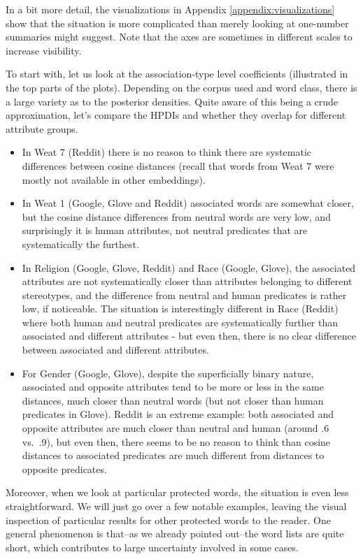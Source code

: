 \documentclass[
  12pt,
  dvipsnames,enabledeprecatedfontcommands]{scrartcl}
\begin{document}
In a bit more detail, the visualizations in Appendix
\ref{appendix:visualizations} show that the situation is more
complicated than merely looking at one-number summaries might suggest.
Note that the axes are sometimes in different scales to increase
visibility.

To start with, let us look at the association-type level coefficients
(illustrated in the top parts of the plots). Depending on the corpus
used and word class, there is a large variety as to the posterior
densities. Quite aware of this being a crude approximation, let's
compare the HPDIs and whether they overlap for different attribute
groups.

\begin{itemize}
\item
  In Weat 7 (Reddit) there is no reason to think there are systematic
  differences between cosine distances (recall that words from Weat 7
  were mostly not available in other embeddings).
\item
  In Weat 1 (Google, Glove and Reddit) associated words are somewhat
  closer, but the cosine distance differences from neutral words are
  very low, and surprisingly it is human attributes, not neutral
  predicates that are systematically the furthest.
\item
  In Religion (Google, Glove, Reddit) and Race (Google, Glove), the
  associated attributes are not systematically closer than attributes
  belonging to different stereotypes, and the difference from neutral
  and human predicates is rather low, if noticeable. The situation is
  interestingly different in Race (Reddit) where both human and neutral
  predicates are systematically further than associated and different
  attributes - but even then, there is no clear difference between
  associated and different attributes.
\item
  For Gender (Google, Glove), despite the superficially binary nature,
  associated and opposite attributes tend to be more or less in the same
  distances, much closer than neutral words (but not closer than human
  predicates in Glove). Reddit is an extreme example: both associated
  and opposite attributes are much closer than neutral and human (around
  .6 vs.~.9), but even then, there seems to be no reason to think than
  cosine distances to associated predicates are much different from
  distances to opposite predicates.
\end{itemize}

Moreover, when we look at particular protected words, the situation is
even less straightforward. We will just go over a few notable examples,
leaving the visual inspection of particular results for other protected
words to the reader. One general phenomenon is that--as we already
pointed out--the word lists are quite short, which contributes to large
uncertainty involved in some cases.
\end{document}
